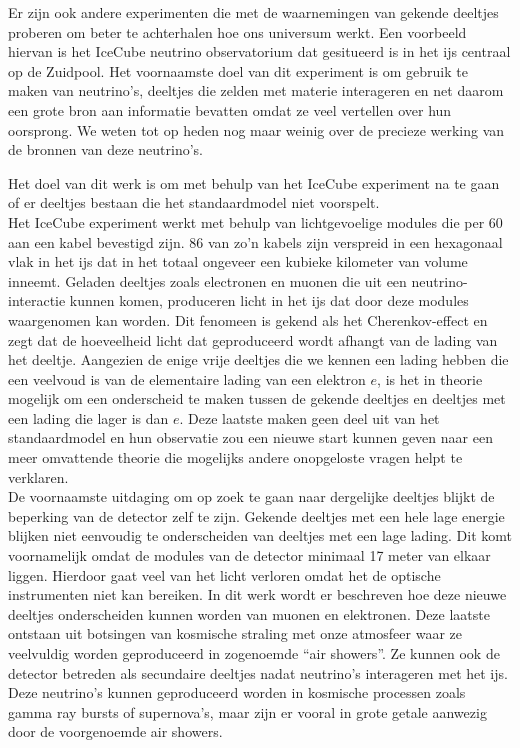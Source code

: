 Er zijn ook andere experimenten die met de waarnemingen van gekende deeltjes proberen om beter te achterhalen hoe ons universum werkt. Een voorbeeld hiervan is het IceCube neutrino observatorium dat gesitueerd is in het ijs centraal op de Zuidpool. Het voornaamste doel van dit experiment is om gebruik te maken van neutrino's, deeltjes die zelden met materie interageren en net daarom een grote bron aan informatie bevatten omdat ze veel vertellen over hun oorsprong. We weten tot op heden nog maar weinig over de precieze werking van de bronnen van deze neutrino's.

Het doel van dit werk is om met behulp van het IceCube experiment na te gaan of er deeltjes bestaan die het standaardmodel niet voorspelt.\\

\noindent Het IceCube experiment werkt met behulp van lichtgevoelige modules die per 60 aan een kabel bevestigd zijn. 86 van zo'n kabels zijn verspreid in een hexagonaal vlak in het ijs dat in het totaal ongeveer een kubieke kilometer van volume inneemt. Geladen deeltjes zoals electronen en muonen die uit een neutrino-interactie kunnen komen, produceren licht in het ijs dat door deze modules waargenomen kan worden. Dit fenomeen is gekend als het Cherenkov-effect en zegt dat de hoeveelheid licht dat geproduceerd wordt afhangt van de lading van het deeltje. Aangezien de enige vrije deeltjes die we kennen een lading hebben die een veelvoud is van de elementaire lading van een elektron $e$, is het in theorie mogelijk om een onderscheid te maken tussen de gekende deeltjes en deeltjes met een lading die lager is dan $e$. Deze laatste maken geen deel uit van het standaardmodel en hun observatie zou een nieuwe start kunnen geven naar een meer omvattende theorie die mogelijks andere onopgeloste vragen helpt te verklaren.\\

\noindent De voornaamste uitdaging om op zoek te gaan naar dergelijke deeltjes blijkt de beperking van de detector zelf te zijn. Gekende deeltjes met een hele lage energie blijken niet eenvoudig te onderscheiden van deeltjes met een lage lading. Dit komt voornamelijk omdat de modules van de detector minimaal 17 meter van elkaar liggen. Hierdoor gaat veel van het licht verloren omdat het de optische instrumenten niet kan bereiken. In dit werk wordt er beschreven hoe deze nieuwe deeltjes onderscheiden kunnen worden van muonen en elektronen. Deze laatste ontstaan uit botsingen van kosmische straling met onze atmosfeer waar ze veelvuldig worden geproduceerd in zogenoemde ``air showers''. Ze kunnen ook de detector betreden als secundaire deeltjes nadat neutrino's interageren met het ijs. Deze neutrino's kunnen geproduceerd worden in kosmische processen zoals gamma ray bursts of supernova's, maar zijn er vooral in grote getale aanwezig door de voorgenoemde air showers.\\

